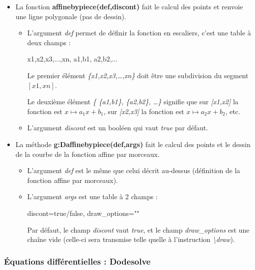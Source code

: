 \begin{itemize}
\item La fonction \textbf{affinebypiece(def,discont)} fait le calcul des points et renvoie une ligne polygonale (pas de dessin).

  \begin{itemize}
  \item  L'argument \emph{def} permet de définir la fonction en escaliers, c'est une table à deux champs :

\begin{TeXcode}
 { {x1,x2,x3,...,xn}, { {a1,b1}, {a2,b2},...} }
\end{TeXcode}

  Le premier élément \emph{\{x1,x2,x3,\ldots,xn\}} doit être une subdivision du segment \([x1,xn]\).
  
  Le deuxième élément \emph{\{ \{a1,b1\}, \{a2,b2\}, \ldots\}} signifie que sur \emph{{[}x1,x2{]}} la fonction est \(x\mapsto a_1x+b_1\), sur \emph{{[}x2,x3{]}} la fonction est
  \(x\mapsto a_2x+b_2\), etc.
  
  \item L'argument \emph{discont} est un booléen qui vaut \emph{true} par défaut.
  \end{itemize}
  
\item La méthode \textbf{g:Daffinebypiece(def,args)} fait le calcul des points et le dessin de la courbe de la fonction affine par morceaux.

  \begin{itemize}
  \item L'argument \emph{def} est le même que celui décrit au-dessus (définition de la fonction affine par morceaux).
  \item L'argument \emph{args} est une table à 2 champs :
  
\begin{TeXcode}
  { discont=true/false, draw_options="" }
\end{TeXcode}

  Par défaut, le champ \emph{discont} vaut \emph{true}, et le champ \emph{draw\_options} est une chaîne vide (celle-ci sera transmise telle quelle à l'instruction \emph{\textbackslash draw}).
  \end{itemize}
\end{itemize}

\subsubsection{Équations différentielles : Dodesolve}

